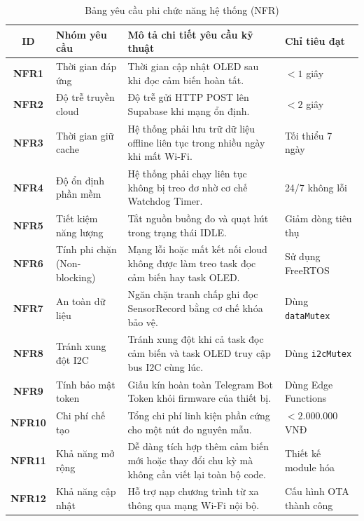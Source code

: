 \begin{table}[H]
\centering
\caption{Bảng yêu cầu phi chức năng hệ thống (NFR)}
\label{tab:nonfunctionalreqs}
\begin{small}
\begin{tabular}{clp{9.0cm}l}
\toprule
\textbf{ID} & \textbf{Nhóm yêu cầu} & \textbf{Mô tả chi tiết yêu cầu kỹ thuật} & \textbf{Chỉ tiêu đạt} \\
\midrule
\textbf{NFR1} & Thời gian đáp ứng & Thời gian cập nhật OLED sau khi đọc cảm biến hoàn tất. & $< 1$ giây \\
\textbf{NFR2} & Độ trễ truyền cloud & Độ trễ gửi HTTP POST lên Supabase khi mạng ổn định. & $< 2$ giây \\
\textbf{NFR3} & Thời gian giữ cache & Hệ thống phải lưu trữ dữ liệu offline liên tục trong nhiều ngày khi mất Wi-Fi. & Tối thiểu 7 ngày \\
\textbf{NFR4} & Độ ổn định phần mềm & Hệ thống phải chạy liên tục không bị treo đơ nhờ cơ chế Watchdog Timer. & 24/7 không lỗi \\
\textbf{NFR5} & Tiết kiệm năng lượng & Tắt nguồn buồng đo và quạt hút trong trạng thái IDLE. & Giảm dòng tiêu thụ \\
\textbf{NFR6} & Tính phi chặn (Non-blocking) & Mạng lỗi hoặc mất kết nối cloud không được làm treo task đọc cảm biến hay task OLED. & Sử dụng FreeRTOS \\
\textbf{NFR7} & An toàn dữ liệu & Ngăn chặn tranh chấp ghi đọc SensorRecord bằng cơ chế khóa bảo vệ. & Dùng \texttt{dataMutex} \\
\textbf{NFR8} & Tránh xung đột I2C & Tránh xung đột khi cả task đọc cảm biến và task OLED truy cập bus I2C cùng lúc. & Dùng \texttt{i2cMutex} \\
\textbf{NFR9} & Tính bảo mật token & Giấu kín hoàn toàn Telegram Bot Token khỏi firmware của thiết bị. & Dùng Edge Functions \\
\textbf{NFR10} & Chi phí chế tạo & Tổng chi phí linh kiện phần cứng cho một nút đo nguyên mẫu. & $< 2.000.000$ VNĐ \\
\textbf{NFR11} & Khả năng mở rộng & Dễ dàng tích hợp thêm cảm biến mới hoặc thay đổi chu kỳ mà không cần viết lại toàn bộ code. & Thiết kế module hóa \\
\textbf{NFR12} & Khả năng cập nhật & Hỗ trợ nạp chương trình từ xa thông qua mạng Wi-Fi nội bộ. & Cấu hình OTA thành công \\
\bottomrule
\end{tabular}
\end{small}
\end{table}
